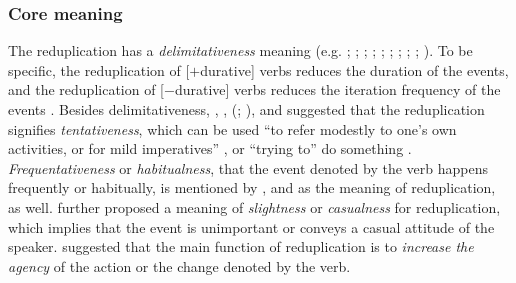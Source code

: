 \subsubsection{Core meaning}\label{sec:core-sem}

The reduplication has a \textit{delimitativeness} meaning (e.g. \citealt[204--205]{Chao1968}; \citealt[232]{LiThompson1981};  \citealt[14]{Li1996}; \citealt[70]{Dai1997};  \citealt[382--383]{Zhu1998}; \citealt[420--421]{Xing2000}; \citealt[48]{Chen2001};  \citealt[288]{Tsao2001}; \citealt[11--12]{Yang2003}; \citealt[Sec. 4.3]{XiaoMcEnery2004}). 
To be specific, the reduplication of [$+$durative] verbs reduces the duration of the events,
and the reduplication of [$-$durative] verbs reduces the iteration frequency of the events \citetext{\citealp[14]{Li1996}; \citealp[149--150]{XiaoMcEnery2004}}.
Besides delimitativeness, \citet[204]{Chao1968}, \citet[276]{Fan1964}, \citeauthor{Smith1991} (\citeyear[356]{Smith1991}; \citeyear[199--120]{Smith1994}), \citet[14]{Li1996} and \citet[290--291]{Tsao2001} suggested that the reduplication signifies \textit{tentativeness}, which can be used
``to refer modestly to one's own activities, or for mild imperatives'' \citep[356]{Smith1991}, or ``trying to'' do something \citep[234]{LiThompson1981}.
\textit{Frequentativeness} or \textit{habitualness}, that the event denoted by the verb happens frequently or habitually, is mentioned by \citet[276]{Fan1964}, \citet[15]{Li1996} and \citet[1]{Qian2000} as the meaning of reduplication, as well.
 \citet[276]{Fan1964} further proposed a meaning of \textit{slightness} or \textit{casualness} for reduplication, which implies that the event is unimportant or conveys a casual attitude of the speaker.
 \citet[Sec. 3.1.3]{Zhu1998} suggested that the main function of reduplication is to \textit{increase the agency} of the action or the change denoted by the verb.


